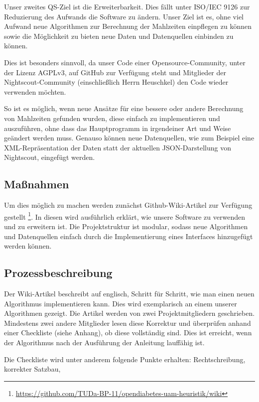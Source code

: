 \documentclass[accentcolor=tud0b,12pt,paper=a4]{tudreport}
\begin{document}
Unser zweites QS-Ziel ist die Erweiterbarkeit. Dies fällt unter ISO/IEC 9126 zur Reduzierung des Aufwands die Software zu ändern. Unser Ziel ist es, ohne viel Aufwand neue Algorithmen zur Berechnung der Mahlzeiten einpflegen zu können sowie die Möglichkeit zu bieten neue Daten und Datenquellen einbinden zu können.

Dies ist besonders sinnvoll, da unser Code einer Opensource-Community, unter der Lizenz AGPLv3, auf GitHub zur Verfügung steht und Mitglieder der Nightscout-Community (einschließlich Herrn Heuschkel) den Code wieder verwenden möchten.

So ist es möglich, wenn neue Ansätze für eine bessere oder andere Berechnung von Mahlzeiten gefunden wurden, diese einfach zu implementieren und auszuführen, ohne dass das Hauptprogramm in irgendeiner Art und Weise geändert werden muss. Genauso können neue Datenquellen, wie zum Beispiel eine XML-Repräsentation der Daten statt der aktuellen JSON-Darstellung von Nightscout, eingefügt werden.

\subsection{Maßnahmen}

Um dies möglich zu machen werden zunächst Github-Wiki-Artikel zur Verfügung gestellt \footnote{\url{https://github.com/TUDa-BP-11/opendiabetes-uam-heuristik/wiki}}. In diesen wird ausführlich erklärt, wie unsere Software zu verwenden und zu erweitern ist. Die Projektstruktur ist modular, sodass neue Algorithmen und Datenquellen einfach durch die Implementierung eines Interfaces hinzugefügt werden können. 

\subsection{Prozessbeschreibung}

Der Wiki-Artikel beschreibt auf englisch, Schritt für Schritt, wie man einen neuen Algorithmus implementieren kann. Dies wird exemplarisch an einem unserer Algorithmen gezeigt. Die Artikel werden von zwei Projektmitgliedern geschrieben. Mindestens zwei andere Mitglieder lesen diese Korrektur und überprüfen anhand einer Checkliste (siehe Anhang), ob diese vollständig sind. Dies ist erreicht, wenn der Algorithmus nach der Ausführung der Anleitung lauffähig ist.

Die Checkliste wird unter anderem folgende Punkte erhalten: Rechtschreibung, korrekter Satzbau, 
\end{document}
